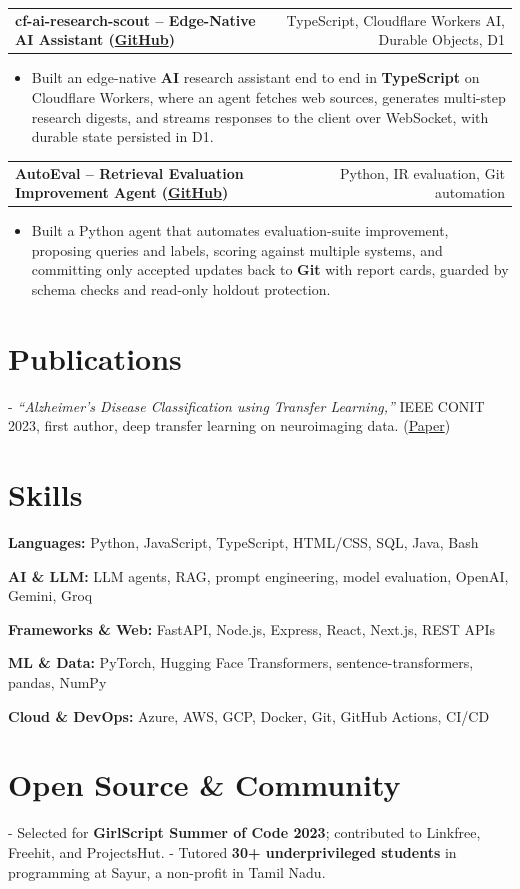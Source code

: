 \documentclass[letterpaper,11pt]{article}
\makeatletter
\newcommand{\projItem}[2]{%
  \vspace{2pt}
  \begin{tabular*}{\textwidth}{@{}l@{\extracolsep{\fill}}r@{}}
    \textbf{#1} & #2 \\
  \end{tabular*}\par\vspace{-3pt}
}
\newcommand{\skillLine}[2]{\textbf{#1:} #2\par\vspace{1.5pt}}
\newcommand{\inlineBlock}[1]{{\setlength{\leftskip}{0.18in}\small #1\par}}
\makeatother
\begin{document}
\projItem{cf-ai-research-scout -- Edge-Native AI Assistant {\normalfont\small(\href{https://github.com/Deva-1903/cf_ai_research_scout}{GitHub})}}{TypeScript, Cloudflare Workers AI, Durable Objects, D1}
\begin{itemize}
  \item Built an edge-native \textbf{AI} research assistant end to end in \textbf{TypeScript} on Cloudflare Workers, where an agent fetches web sources, generates multi-step research digests, and streams responses to the client over WebSocket, with durable state persisted in D1.
\end{itemize}

\projItem{AutoEval -- Retrieval Evaluation Improvement Agent {\normalfont\small(\href{https://github.com/Deva-1903/AutoEval}{GitHub})}}{Python, IR evaluation, Git automation}
\begin{itemize}
  \item Built a Python agent that automates evaluation-suite improvement, proposing queries and labels, scoring against multiple systems, and committing only accepted updates back to \textbf{Git} with report cards, guarded by schema checks and read-only holdout protection.
\end{itemize}

\section{Publications}
\vspace{2pt}
\inlineBlock{- \textit{``Alzheimer's Disease Classification using Transfer Learning,''} IEEE CONIT 2023, first author, deep transfer learning on neuroimaging data. {\normalfont\small(\href{https://ieeexplore.ieee.org/document/10205760}{Paper})}}

\section{Skills}
\skillLine{Languages}{Python, JavaScript, TypeScript, HTML/CSS, SQL, Java, Bash}
\skillLine{AI \& LLM}{LLM agents, RAG, prompt engineering, model evaluation, OpenAI, Gemini, Groq}
\skillLine{Frameworks \& Web}{FastAPI, Node.js, Express, React, Next.js, REST APIs}
\skillLine{ML \& Data}{PyTorch, Hugging Face Transformers, sentence-transformers, pandas, NumPy}
\skillLine{Cloud \& DevOps}{Azure, AWS, GCP, Docker, Git, GitHub Actions, CI/CD}

\section{Open Source \& Community}
\inlineBlock{- Selected for \textbf{GirlScript Summer of Code 2023}; contributed to Linkfree, Freehit, and ProjectsHut. - Tutored \textbf{30+ underprivileged students} in programming at Sayur, a non-profit in Tamil Nadu.}
\end{document}
